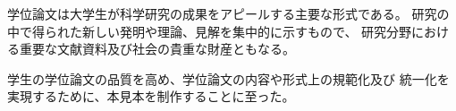 学位論文は大学生が科学研究の成果をアピールする主要な形式である。
研究の中で得られた新しい発明や理論、見解を集中的に示すもので、
研究分野における重要な文献資料及び社会の貴重な財産ともなる。

学生の学位論文の品質を高め、学位論文の内容や形式上の規範化及び
統一化を実現するために、本見本を制作することに至った。
